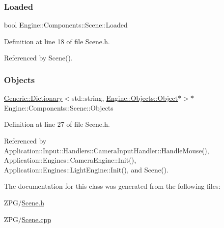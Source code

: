 \subsubsection{\texorpdfstring{Loaded}{Loaded}}
{\footnotesize\ttfamily bool Engine\+::\+Components\+::\+Scene\+::\+Loaded\hspace{0.3cm}{\ttfamily [protected]}}



Definition at line 18 of file Scene.\+h.



Referenced by Scene().

\mbox{\label{classEngine_1_1Components_1_1Scene_a23481feabaaa56bf5613765db03af4da}} 
\subsubsection{\texorpdfstring{Objects}{Objects}}
{\footnotesize\ttfamily \mbox{\hyperlink{classGeneric_1_1Dictionary}{Generic\+::\+Dictionary}}$<$std\+::string, \mbox{\hyperlink{classEngine_1_1Objects_1_1Object}{Engine\+::\+Objects\+::\+Object}}$\ast$$>$$\ast$ Engine\+::\+Components\+::\+Scene\+::\+Objects}



Definition at line 27 of file Scene.\+h.



Referenced by Application\+::\+Input\+::\+Handlers\+::\+Camera\+Input\+Handler\+::\+Handle\+Mouse(), Application\+::\+Engines\+::\+Camera\+Engine\+::\+Init(), Application\+::\+Engines\+::\+Light\+Engine\+::\+Init(), and Scene().



The documentation for this class was generated from the following files\+:\begin{DoxyCompactItemize}
\item 
Z\+P\+G/\mbox{\hyperlink{Scene_8h}{Scene.\+h}}\item 
Z\+P\+G/\mbox{\hyperlink{Scene_8cpp}{Scene.\+cpp}}\end{DoxyCompactItemize}
